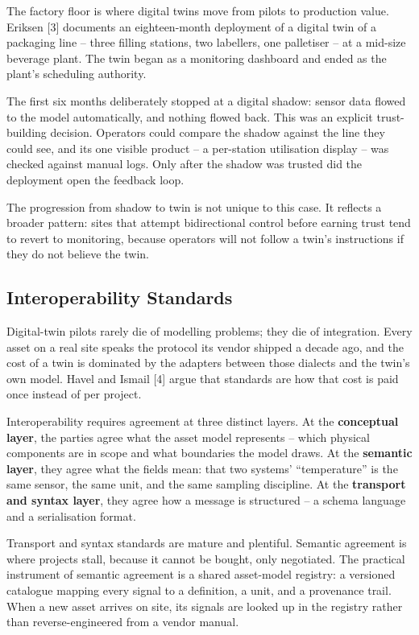 \documentclass[
  12pt,
  a4paper,
]{article}
\begin{document}
The factory floor is where digital twins move from pilots to production
value. Eriksen {[}3{]} documents an eighteen-month deployment of a
digital twin of a packaging line -- three filling stations, two
labellers, one palletiser -- at a mid-size beverage plant. The twin
began as a monitoring dashboard and ended as the plant's scheduling
authority.

The first six months deliberately stopped at a digital shadow: sensor
data flowed to the model automatically, and nothing flowed back. This
was an explicit trust-building decision. Operators could compare the
shadow against the line they could see, and its one visible product -- a
per-station utilisation display -- was checked against manual logs. Only
after the shadow was trusted did the deployment open the feedback loop.

The progression from shadow to twin is not unique to this case. It
reflects a broader pattern: sites that attempt bidirectional control
before earning trust tend to revert to monitoring, because operators
will not follow a twin's instructions if they do not believe the twin.

\hypertarget{interoperability-standards}{%
\subsection{Interoperability
Standards}\label{interoperability-standards}}

Digital-twin pilots rarely die of modelling problems; they die of
integration. Every asset on a real site speaks the protocol its vendor
shipped a decade ago, and the cost of a twin is dominated by the
adapters between those dialects and the twin's own model. Havel and
Ismail {[}4{]} argue that standards are how that cost is paid once
instead of per project.

Interoperability requires agreement at three distinct layers. At the
\textbf{conceptual layer}, the parties agree what the asset model
represents -- which physical components are in scope and what boundaries
the model draws. At the \textbf{semantic layer}, they agree what the
fields mean: that two systems' ``temperature'' is the same sensor, the
same unit, and the same sampling discipline. At the \textbf{transport
and syntax layer}, they agree how a message is structured -- a schema
language and a serialisation format.

Transport and syntax standards are mature and plentiful. Semantic
agreement is where projects stall, because it cannot be bought, only
negotiated. The practical instrument of semantic agreement is a shared
asset-model registry: a versioned catalogue mapping every signal to a
definition, a unit, and a provenance trail. When a new asset arrives on
site, its signals are looked up in the registry rather than
reverse-engineered from a vendor manual.
\end{document}
